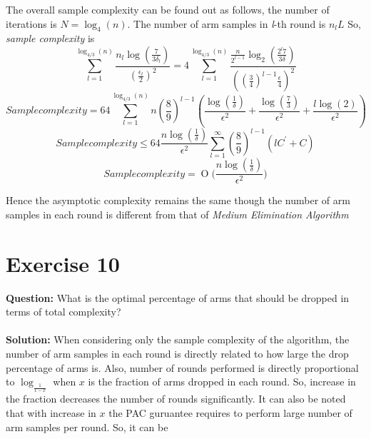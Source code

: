 \documentclass[a4paper,10pt]{report}
\newcommand{\BigO}[1]{\ensuremath{\operatorname{O}\bigl(#1\bigr)}}
\begin{document}
The overall sample complexity can be found out as follows,
the number of iterations is $N = \log_4(n)$. The number of arm samples in \emph{l}-th round is $n_lL$
So, \emph{sample complexity} is 
\[ \sum_{l=1}^{\log_{4/3}(n)} \frac{n_l \log(\frac{7}{3\delta_l})}{(\frac{\epsilon_l}{2})^2} = 4 \sum_{l=1}^{\log_{4/3}(n)} \frac{\frac{n}{2^{l-1}} \log_2(\frac{2^l7}{3\delta})}{((\frac{3}{4})^{l-1} \frac{\epsilon}{4})^2}\]
\[ Sample complexity = 64 \sum_{l=1}^{\log_{4/3}(n)} n(\frac{8}{9})^{l-1}(\frac{\log(\frac{1}{\delta})}{\epsilon^2} + \frac{\log(\frac{7}{3})}{\epsilon^2} + \frac{l\log(2)}{\epsilon^2})
\]
\[ Sample complexity \leq 64\frac{n\log(\frac{1}{\delta})}{\epsilon^2} \sum_{l=1}^{\infty} (\frac{8}{9})^{l-1}(lC^{'} + C)\]
\[ Sample complexity = \BigO{\frac{n\log(\frac{1}{\delta})}{\epsilon^2}}\]

Hence the asymptotic complexity remains the same though the number of arm samples in each round is different from that of \emph{Medium Elimination Algorithm}

\section{Exercise 10}
\textbf{Question:}
What is the optimal percentage of arms that should be dropped in terms of total complexity?
\\\\
\textbf{Solution:}
When considering only the sample complexity of the algorithm, the number of arm samples in each round is directly related to how large the drop percentage of arms is. Also, number of rounds performed is directly proportional to $\log_{\frac{1}{1-x}}$ when $x$ is the fraction of arms dropped in each round. So, increase in the fraction decreases the number of rounds significantly.  It can also be noted that with increase in $x$ the PAC guruantee requires to perform large number of arm samples per round. So, it can be 
\end{document}
